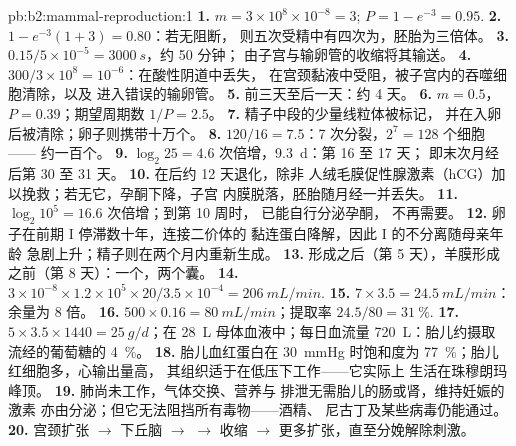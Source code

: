 \begin{solution}{pb:b2:mammal-reproduction:1}
\textbf{1.} $m = 3\times 10^{8}\times 10^{-8} = 3$; $P = 1 - e^{-3} =
0.95$.
\textbf{2.} $1 - e^{-3}(1 + 3) = 0.80$：若无阻断，
则五次受精中有四次为，胚胎为三倍体。
\textbf{3.} $0.15/5\times 10^{-5} = \qty{3000}{s}$，约 50 分钟；
由子宫与输卵管的收缩将其输送。
\textbf{4.} $300/3\times 10^{8} = 10^{-6}$：在酸性阴道中丢失，
在宫颈黏液中受阻，被子宫内的吞噬细胞清除，以及
进入错误的输卵管。
\textbf{5.} 前三天至后一天：约
4 天。
\textbf{6.} $m = 0.5$，$P = 0.39$；期望周期数 $1/P = 2.5$。
\textbf{7.} 精子中段的少量线粒体被标记，
并在入卵后被清除；卵子则携带十万个。
\textbf{8.} $120/16 = 7.5$：7 次分裂，$2^{7} = 128$ 个细胞——
约一百个。
\textbf{9.} $\log_2 25 = 4.6$ 次倍增，\qty{9.3}{d}：第 16 至 17 天；
即末次月经后第 30 至 31 天。
\textbf{10.} 在后约 12 天退化，除非
人绒毛膜促性腺激素（hCG）加以挽救；若无它，孕酮下降，子宫
内膜脱落，胚胎随月经一并丢失。
\textbf{11.} $\log_2 10^{5} = 16.6$ 次倍增；到第 10 周时，
已能自行分泌孕酮，
不再需要。
\textbf{12.} 卵子在前期 I 停滞数十年，连接二价体的
黏连蛋白降解，因此 I 的不分离随母亲年龄
急剧上升；精子则在两个月内重新生成。
\textbf{13.} 形成之后（第 5 天），羊膜形成之前（第
8 天）：一个，两个囊。
\textbf{14.} $3\times 10^{-8}\times 1.2\times 10^{5}\times 20/3.5\times
10^{-4} = \qty{206}{mL/min}$.
\textbf{15.} $7\times 3.5 = \qty{24.5}{mL/min}$：余量为 8 倍。
\textbf{16.} $500\times 0.16 = \qty{80}{mL/min}$；提取率
$24.5/80 = \qty{31}{\%}$.
\textbf{17.} $5\times 3.5\times 1440 = \qty{25}{g/d}$；在 \qty{28}{L}
母体血液中；每日血流量 \qty{720}{L}：胎儿约摄取
流经的葡萄糖的 \qty{4}{\%}。
\textbf{18.} 胎儿血红蛋白在
\qty{30}{mmHg} 时饱和度为 \qty{77}{\%}；胎儿红细胞多，心输出量高，
其组织适于在低压下工作——它实际上
生活在珠穆朗玛峰顶。
\textbf{19.} 肺尚未工作，气体交换、营养与
排泄无需胎儿的肠或肾，维持妊娠的激素
亦由分泌；但它无法阻挡所有毒物——酒精、
尼古丁及某些病毒仍能通过。
\textbf{20.} 宫颈扩张 $\to$ 下丘脑 $\to$  $\to$
收缩 $\to$ 更多扩张，直至分娩解除刺激。

\end{solution}
